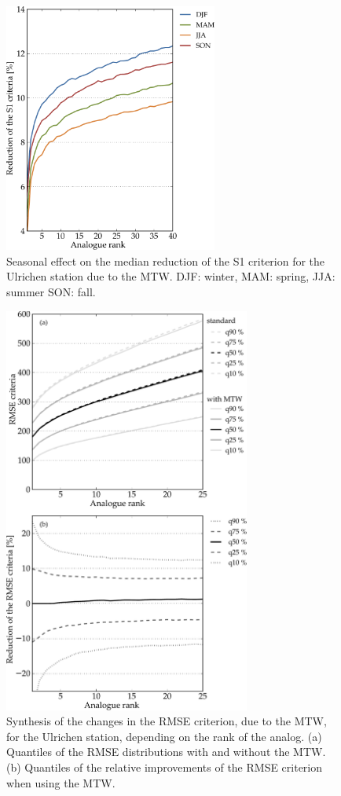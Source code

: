 \documentclass[hess, manuscript]{copernicus}
\begin{document}
\begin{figure}[htb]
	\begin{center}
		\includegraphics[width=7cm]{figures/changes_S1_seasons.pdf}
	\end{center}
	\caption{Seasonal effect on the median reduction of the S1 criterion for the Ulrichen station due to the MTW. DJF: winter, MAM: spring, JJA: summer SON: fall.}
	\label{fig:changes_S1_seasons}
\end{figure}

\begin{figure}[htb]
	\begin{center}
		\includegraphics[width=8.1cm]{figures/changes_RMSE_value_and_gain.pdf}
	\end{center}
	\caption{Synthesis of the changes in the RMSE criterion, due to the MTW, for the Ulrichen station, depending on the rank of the analog. (a) Quantiles of the RMSE distributions with and without the MTW. (b) Quantiles of the relative improvements of the RMSE criterion when using the MTW.}
	\label{fig:changes_RMSE}
\end{figure}
\end{document}
